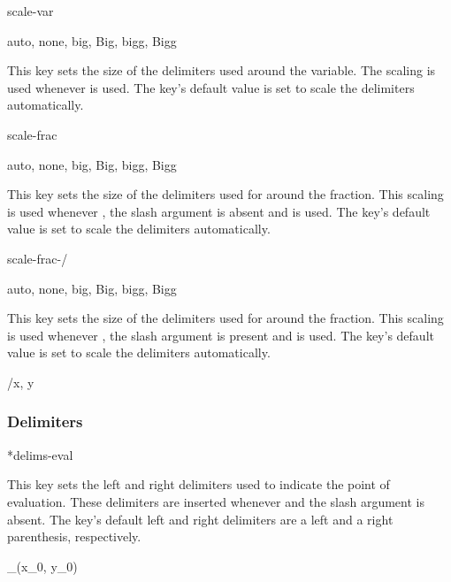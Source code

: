 \begin{option}{scale-var}
	\begin{values}[default = auto]
		auto, none, big, Big, bigg, Bigg
	\end{values}
	This key sets the size of the delimiters used around the variable. The scaling is used whenever  is used. The key's default value is set to scale the delimiters automatically.
	\begin{example}
	\end{example}
\end{option}

\begin{option}{scale-frac}
	\begin{values}[default = auto]
		auto, none, big, Big, bigg, Bigg
	\end{values}
	This key sets the size of the delimiters used for around the fraction. This scaling is used whenever , the slash argument is absent and  is used. The key's default value is set to scale the delimiters automatically.
	\begin{example}
		\pdv[scale-frac=bigg, frac]{f}{x, y}
	\end{example}
\end{option}

\begin{option}{scale-frac-/}
	\begin{values}[default = auto]
		auto, none, big, Big, bigg, Bigg
	\end{values}
	This key sets the size of the delimiters used for around the fraction. This scaling is used whenever , the slash argument is present and  is used. The key's default value is set to scale the delimiters automatically.
	\begin{example}
		/{x, y}
	\end{example}
\end{option}

\subsubsection*{Delimiters}

\begin{option}*{delims-eval}
	\begin{values}[default = .~\cs{rvert}]
		\meta{right delimiter}
	\end{values}
	This key sets the left and right delimiters used to indicate the point of evaluation. These delimiters are inserted whenever  and the slash argument is absent. The key's default left and right delimiters are a left and a right parenthesis, respectively.
	\begin{example}
		_{(x_0, y_0)}
	\end{example}
\end{option}

